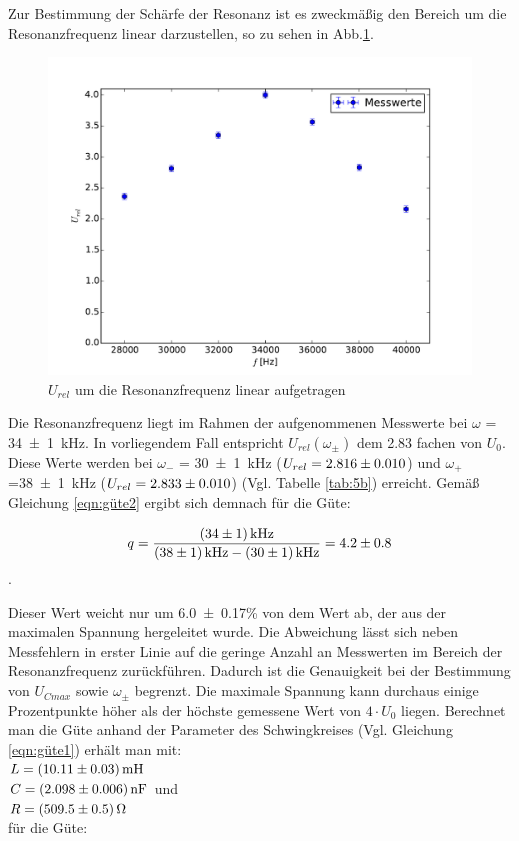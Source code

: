 Zur Bestimmung der Schärfe der Resonanz ist es zweckmäßig den Bereich um die
Resonanzfrequenz linear darzustellen, so zu sehen in Abb.\ref{fig:5clin}.
\begin{figure}[H]
  \centering
  \includegraphics[width=\textwidth]{5c2.pdf}
  \caption{$U_{rel}$ um die Resonanzfrequenz linear aufgetragen}
  \label{fig:5clin}
\end{figure}
Die Resonanzfrequenz liegt im Rahmen der aufgenommenen Messwerte bei
$\omega$ = \SI{34 +- 1}{\kilo\hertz}.
In vorliegendem Fall entspricht $U_{rel}(\omega_{\pm})$ dem 2.83 fachen von $U_0$.
Diese Werte werden bei $\omega_-$ = \SI{30+-1}{\kilo\hertz}
($U_{rel}=\num{2.816+-0.01}$) und
$\omega_+$=\SI{38+-1}{\kilo\hertz} ($U_{rel} = \num{2.833+-0.01}$)
(Vgl. Tabelle \ref{tab:5b}) erreicht.
Gemäß Gleichung \ref{eqn:güte2} ergibt
sich demnach für die Güte:

$$q = \frac{\SI{34+-1}{\kilo\hertz}}{\SI{38+-1}{\kilo\hertz}-\SI{30+-1}
{\kilo\hertz}} = \num{4.2+-0.8}$$ .

Dieser Wert weicht nur um \num{6.0+-0.17}\% von dem Wert ab, der aus der maximalen
Spannung hergeleitet wurde. Die Abweichung lässt sich neben Messfehlern in erster
Linie auf die geringe Anzahl an Messwerten im Bereich der Resonanzfrequenz
zurückführen. Dadurch ist die Genauigkeit bei der Bestimmung von
$U_{Cmax}$ sowie $\omega_\pm$ begrenzt. Die maximale Spannung kann durchaus
einige Prozentpunkte höher als der höchste gemessene Wert von $4\cdot U_0$
liegen.
Berechnet man die Güte anhand der Parameter des Schwingkreises
(Vgl. Gleichung \ref{eqn:güte1}) erhält man mit: \\
$L = \SI{10.11 +- 0.03}{\milli\henry}$  \\
$C = \SI{2.098 +- 0.006}{\nano\farad}$ und \\
$R = \SI{509.5 +- 0.5}{\ohm}$ \\
für die Güte:

